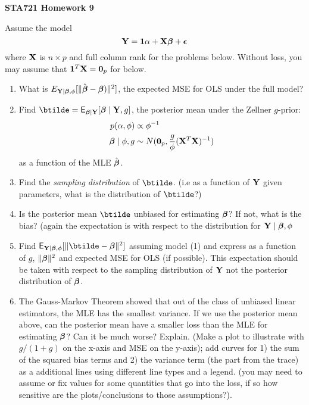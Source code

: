 \documentclass[12pt]{article}
\begin{document}
\begin{center}
{\bf STA721  Homework 9} \\
\end{center}
\vspace{.5in}

\noindent
Assume  the model
\begin{equation}
  \label{eq:true}
\mathbf{Y} = \mathbf{1} \alpha + \mathbf{X} \boldsymbol{\beta} + \boldsymbol{\epsilon} 
\end{equation}
where $\mathbf{X}$ is $n \times p$ and
full column rank for the problems below.  Without loss, you may assume
that $\mathbf{1}^T\mathbf{X} = \mathbf{0}_p$ for below.


\begin{enumerate}

 \item What is  $E_{\mathbf{Y} \mid \boldsymbol{\beta}, \phi}[\|\hat{\boldsymbol{\beta}} - \boldsymbol{\beta})\|^2]$,
  the expected MSE for OLS under the full model?

\item  Find  $\btilde = \E_{\b \mid \Y}[\b \mid \Y, g]$, the
  posterior mean under the Zellner $g$-prior:
  \begin{align*}
  p(\alpha, \phi) & \propto \phi^{-1}     \\
  \boldsymbol{\beta} \mid \phi, g & \sim N(\mathbf{0}_p, \frac{g}{\phi} (\mathbf{X}^T \mathbf{X})^{-1})
  \end{align*} as a function of the MLE $\hat{\boldsymbol{\beta}}$.

\item  Find the {\it sampling
  distribution} of $\btilde$. (i.e as a function of $\mathbf{Y}$ given
parameters, what is the  distribution of $\btilde$?)
  
\item  Is the posterior mean $\btilde$ 
   unbiased for estimating $\boldsymbol{\beta}$?  If not, what is the bias?  (again the
   expectation is with respect to the distribution for $\mathbf{Y} \mid \boldsymbol{\beta}, \phi$

 \item Find $\E_{\Y \mid \b, \phi}[\| \btilde - \b \|^2]$ assuming
   model (1) and express as a function of $g$, $\|\boldsymbol{\beta}\|^2$ and
   expected MSE for
   OLS (if possible).  This expectation should be taken with respect
   to the sampling distribution of $\mathbf{Y}$ not the posterior distribution
   of $\boldsymbol{\beta}$.


 \item The Gauss-Markov Theorem showed that out of the class of
   unbiased linear estimators, the MLE has the smallest variance.  If
   we use the posterior mean above, can the posterior mean have a
   smaller loss than the MLE for estimating $\boldsymbol{\beta}$?  Can it be much
   worse? Explain.  (Make a plot to illustrate with $g/(1+g)$ on the
   x-axis and MSE on the y-axis); add curves for 1) the sum of the
   squared bias terms and 2) the variance term (the part from the
   trace) as a additional lines using different line types and a
   legend.  (you may need to assume or fix values for some quantities
   that go into the loss, if so how sensitive are the
   plots/conclusions to those assumptions?).


\end{enumerate}
\end{document}
